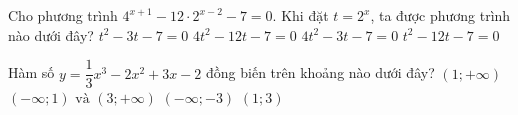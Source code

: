 \begin{ex}%
	Cho phương trình $4^{x+1}-12\cdot2^{x-2}-7=0$. Khi đặt $t=2^x$, ta được phương trình nào dưới đây?
	\choice
	{$t^2-3t-7=0$}
	{$4t^2-12t-7=0$}
	{\True $4t^2-3t-7=0$}
	{$t^2-12t-7=0$}
\end{ex}

\begin{ex}%
	Hàm số $y=\dfrac{1}{3}x^3-2x^2+3x-2$ đồng biến trên khoảng nào dưới đây?
	\choice
	{$(1;+\infty)$}
	{\True $(-\infty;1) \text{ và } (3;+\infty)$}
	{$(-\infty;-3)$}
	{$(1;3)$}
\end{ex}

